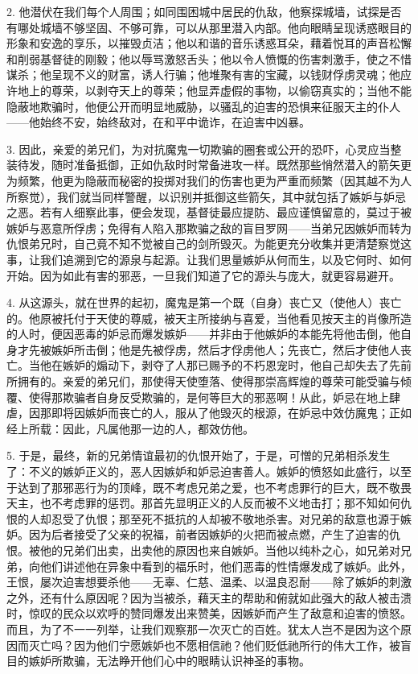 2. 他潜伏在我们每个人周围；如同围困城中居民的仇敌，他察探城墙，试探是否有哪处城墙不够坚固、不够可靠，可以从那里潜入内部。他向眼睛呈现诱惑眼目的形象和安逸的享乐，以摧毁贞洁；他以和谐的音乐诱惑耳朵，藉着悦耳的声音松懈和削弱基督徒的刚毅；他以辱骂激怒舌头；他以令人愤慨的伤害刺激手，使之不惜谋杀；他呈现不义的财富，诱人行骗；他堆聚有害的宝藏，以钱财俘虏灵魂；他应许地上的尊荣，以剥夺天上的尊荣；他显弄虚假的事物，以偷窃真实的；当他不能隐蔽地欺骗时，他便公开而明显地威胁，以骚乱的迫害的恐惧来征服天主的仆人——他始终不安，始终敌对，在和平中诡诈，在迫害中凶暴。\par

3. 因此，亲爱的弟兄们，为对抗魔鬼一切欺骗的圈套或公开的恐吓，心灵应当整装待发，随时准备抵御，正如仇敌时时常备进攻一样。既然那些悄然潜入的箭矢更为频繁，他更为隐蔽而秘密的投掷对我们的伤害也更为严重而频繁（因其越不为人所察觉），我们就当同样警醒，以识别并抵御这些箭矢，其中就包括了嫉妒与妒忌之恶。若有人细察此事，便会发现，基督徒最应提防、最应谨慎留意的，莫过于被嫉妒与恶意所俘虏；免得有人陷入那欺骗之敌的盲目罗网——当弟兄因嫉妒而转为仇恨弟兄时，自己竟不知不觉被自己的剑所毁灭。为能更充分收集并更清楚察觉这事，让我们追溯到它的源泉与起源。让我们思量嫉妒从何而生，以及它何时、如何开始。因为如此有害的邪恶，一旦我们知道了它的源头与庞大，就更容易避开。\par

4. 从这源头，就在世界的起初，魔鬼是第一个既（自身）丧亡又（使他人）丧亡的。他原被托付于天使的尊威，被天主所接纳与喜爱，当他看见按天主的肖像所造的人时，便因恶毒的妒忌而爆发嫉妒——并非由于他嫉妒的本能先将他击倒，他自身才先被嫉妒所击倒；他是先被俘虏，然后才俘虏他人；先丧亡，然后才使他人丧亡。当他在嫉妒的煽动下，剥夺了人那已赐予的不朽恩宠时，他自己却失去了先前所拥有的。亲爱的弟兄们，那使得天使堕落、使得那崇高辉煌的尊荣可能受骗与倾覆、使得那欺骗者自身反受欺骗的，是何等巨大的邪恶啊！从此，妒忌在地上肆虐，因那即将因嫉妒而丧亡的人，服从了他毁灭的根源，在妒忌中效仿魔鬼；正如经上所载：因此，凡属他那一边的人，都效仿他。\par

5. 于是，最终，新的兄弟情谊最初的仇恨开始了，于是，可憎的兄弟相杀发生了：不义的嫉妒正义的，恶人因嫉妒和妒忌迫害善人。嫉妒的愤怒如此盛行，以至于达到了那邪恶行为的顶峰，既不考虑兄弟之爱，也不考虑罪行的巨大，既不敬畏天主，也不考虑罪的惩罚。那首先显明正义的人反而被不义地击打；那不知如何仇恨的人却忍受了仇恨；那至死不抵抗的人却被不敬地杀害。对兄弟的敌意也源于嫉妒。因为后者接受了父亲的祝福，前者因嫉妒的火把而被点燃，产生了迫害的仇恨。被他的兄弟们出卖，出卖他的原因也来自嫉妒。当他以纯朴之心，如兄弟对兄弟，向他们讲述他在异象中看到的福乐时，他们恶毒的性情爆发成了嫉妒。此外，王恨，屡次迫害想要杀他——无辜、仁慈、温柔、以温良忍耐——除了嫉妒的刺激之外，还有什么原因呢？因为当被杀，藉天主的帮助和俯就如此强大的敌人被击溃时，惊叹的民众以欢呼的赞同爆发出来赞美，因嫉妒而产生了敌意和迫害的愤怒。而且，为了不一一列举，让我们观察那一次灭亡的百姓。犹太人岂不是因为这个原因而灭亡吗？因为他们宁愿嫉妒也不愿相信祂？他们贬低祂所行的伟大工作，被盲目的嫉妒所欺骗，无法睁开他们心中的眼睛认识神圣的事物。\par


